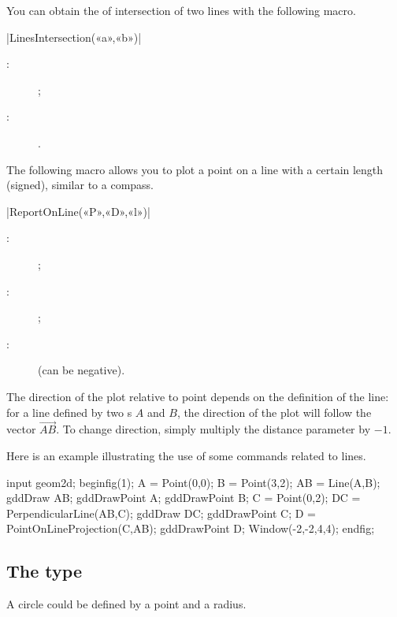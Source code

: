 \documentclass[a4paper,english]{article}
\begin{document}
You can obtain the  of intersection of two lines with the
following macro.
\begin{colourband}
\macro|LinesIntersection(«a»,«b»)|
\begin{description}
  \item[:]   ;
  \item[:] .
\end{description}
\end{colourband}

The following macro allows you to plot a point on a line with a certain
length (signed), similar to a compass.

\begin{colourband}
\macro|ReportOnLine(«P»,«D»,«l»)|
\begin{description}
  \item[:]   ;
  \item[:]  ;
  \item[:]  (can be negative).
\end{description}
\end{colourband}

The direction of the plot relative to point  depends on the definition
of  
the line: for a line defined by two s $A$ and $B$, the direction
of the plot will follow the vector $\overrightarrow{AB}$. To change direction,
simply multiply the distance parameter  by $-1$.

Here is an example illustrating the use of some commands related to lines.

\begin{ExempleMP}
input geom2d;
beginfig(1);
A = Point(0,0);
B = Point(3,2);
AB = Line(A,B);
gddDraw AB;
gddDrawPoint A;
gddDrawPoint B;
C = Point(0,2);
DC = PerpendicularLine(AB,C);
gddDraw DC;
gddDrawPoint C;
D = PointOnLineProjection(C,AB);
gddDrawPoint D;
Window(-2,-2,4,4);
endfig;
\end{ExempleMP}



\subsection{The  type}
A circle could be defined by a point and a radius.
\end{document}
